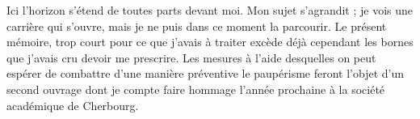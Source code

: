 \documentclass[french,twoside]{book} %
\begin{document}
Ici l’horizon s’étend de toutes parts devant moi. Mon sujet s’agrandit ; je vois une carrière qui s’ouvre, mais je ne puis dans ce moment la parcourir. Le présent mémoire, trop court pour ce que j’avais à traiter excède déjà cependant les bornes que j’avais cru devoir me prescrire. Les mesures à l’aide desquelles on peut espérer de combattre d’une manière préventive le paupérisme feront l’objet d’un second ouvrage dont je compte faire hommage l’année prochaine à la société académique de Cherbourg.
\end{document}
